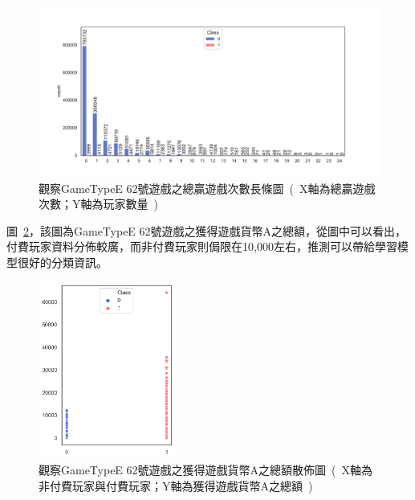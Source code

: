 \begin{figure}[!htb]
    \begin{center}
      \includegraphics[width=1\textwidth]{figures/evaluation/Image_GameTypeE62TotalWinTimes.pdf}
      \caption[觀察GameTypeE 62號遊戲之總贏遊戲次數長條圖]{觀察GameTypeE 62號遊戲之總贏遊戲次數長條圖\ (\ X軸為總贏遊戲次數；Y軸為玩家數量\ )\ }
      \label{fig:eva_ValuableFeatureBarPlot_GameTypeE62TotalWinTimes}
    \end{center}
\end{figure}

圖~\ref{fig:eva_ValuableFeatureScatterPlot_GameTyeE62TotalCoinAAwarded}，該圖為GameTypeE 62號遊戲之獲得遊戲貨幣A之總額，從圖中可以看出，付費玩家資料分佈較廣，而非付費玩家則侷限在10,000左右，推測可以帶給學習模型很好的分類資訊。

\begin{figure}[!htb]
    \begin{center}
      \includegraphics[width=0.4\textwidth]{figures/evaluation/Image_GameTypeE62TotalCoinAAwarded.png}
      \caption[觀察GameTypeE 62號遊戲之獲得遊戲貨幣A之總額散佈圖]{觀察GameTypeE 62號遊戲之獲得遊戲貨幣A之總額散佈圖\ (\ X軸為非付費玩家與付費玩家；Y軸為獲得遊戲貨幣A之總額\ )\ }
      \label{fig:eva_ValuableFeatureScatterPlot_GameTyeE62TotalCoinAAwarded}
    \end{center}
\end{figure}
\newpage

